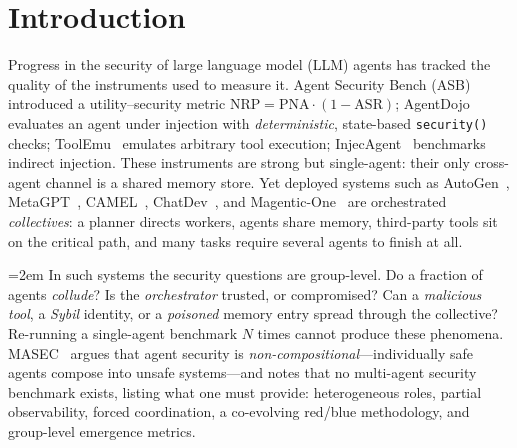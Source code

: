 \section{Introduction}
\label{sec:intro}

Progress in the security of large language model (LLM) agents has tracked the quality of
the instruments used to measure it. Agent Security Bench
(ASB)~\cite{zhang2025asb} introduced a utility--security metric
$\mathrm{NRP}=\mathrm{PNA}\cdot(1-\mathrm{ASR})$; AgentDojo~\cite{debenedetti2024agentdojo}
evaluates an agent under injection with \emph{deterministic}, state-based
\texttt{security()} checks; ToolEmu~\cite{ruan2024toolemu} emulates arbitrary tool
execution; InjecAgent~\cite{zhan2024injecagent} benchmarks indirect injection. These
instruments are strong but single-agent: their only cross-agent channel is a shared memory
store. Yet deployed systems such as AutoGen~\cite{wu2023autogen},
MetaGPT~\cite{hong2023metagpt}, CAMEL~\cite{li2023camel},
ChatDev~\cite{qian2024chatdev}, and Magentic-One~\cite{fourney2024magenticone} are
orchestrated \emph{collectives}: a planner directs workers, agents share memory,
third-party tools sit on the critical path, and many tasks require several agents to
finish at all.

\begingroup\emergencystretch=2em
In such systems the security questions are group-level. Do a fraction of agents
\emph{collude}? Is the \emph{orchestrator} trusted, or compromised? Can a \emph{malicious
tool}, a \emph{Sybil} identity, or a \emph{poisoned} memory entry spread through the
collective? Re-running a single-agent benchmark $N$ times cannot produce these phenomena.
MASEC~\cite{schroederdewitt2025masec} argues that agent security is
\emph{non-compositional}---individually safe agents compose into unsafe systems---and
notes that no multi-agent security benchmark exists, listing what one must provide:
heterogeneous roles, partial observability, forced coordination, a co-evolving red/blue
methodology, and group-level emergence metrics.\par
\endgroup

